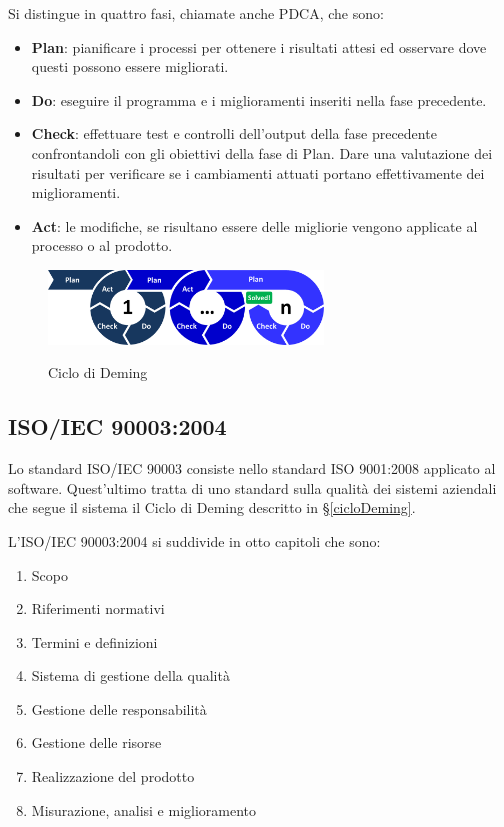 	Si distingue in quattro fasi, chiamate anche PDCA, che sono:

	\begin{itemize}
		\item \textbf{Plan}: pianificare i processi per ottenere i risultati attesi ed osservare dove questi possono essere migliorati.
		\item \textbf{Do}: eseguire il programma e i miglioramenti inseriti nella fase precedente.
		\item \textbf{Check}: effettuare test e controlli dell'output della fase precedente confrontandoli con gli obiettivi della fase di Plan. Dare una valutazione dei risultati per verificare se i cambiamenti attuati portano effettivamente dei miglioramenti.
		\item \textbf{Act}: le modifiche, se risultano essere delle migliorie vengono applicate al processo o al prodotto.
	\end{itemize}

	\begin{figure}[H]
		\centering
		\includegraphics[width=0.65\textwidth]{img/PDCA}
		\label{fig:PDCA}
		\caption[Ciclo di Deming]{Ciclo di Deming\protect\footnotemark}
	\end{figure}


	\subsection{ISO/IEC 90003:2004}
	Lo standard ISO/IEC 90003 consiste nello standard ISO 9001:2008 applicato al software. Quest'ultimo tratta di uno standard sulla qualità dei sistemi aziendali che segue il sistema il Ciclo di Deming descritto in \S\ref{cicloDeming}.

	L'ISO/IEC 90003:2004 si suddivide in otto capitoli che sono:

	\begin{enumerate}
		\item Scopo
		\item Riferimenti normativi
		\item Termini e definizioni
		\item Sistema di gestione della qualità
		\item Gestione delle responsabilità
		\item Gestione delle risorse
		\item Realizzazione del prodotto
		\item Misurazione, analisi e miglioramento
	\end{enumerate}

